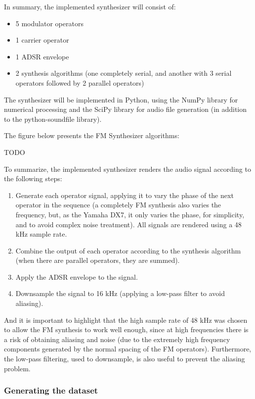 \documentclass[sigconf,natbib=false]{acmart}
\begin{document}
In summary, the implemented synthesizer will consist of:

\begin{itemize}
\item 5 modulator operators
\item 1 carrier operator
\item 1 ADSR envelope
\item 2 synthesis algorithms (one completely serial, and another with 3 serial operators followed by 2 parallel operators)
\end{itemize}

The synthesizer will be implemented in Python, using the NumPy library for numerical processing and the SciPy library for audio file generation (in addition to the python-soundfile library).

The figure below presents the FM Synthesizer algorithms:

TODO

To summarize, the implemented synthesizer renders the audio signal according to the following steps:

\begin{enumerate}
\item Generate each operator signal, applying it to vary the phase of the next operator in the sequence (a completely FM synthesis also varies the frequency, but, as the Yamaha DX7, it only varies the phase, for simplicity, and to avoid complex noise treatment). All signals are rendered using a 48 kHz sample rate.
\item Combine the output of each operator according to the synthesis algorithm (when there are parallel operators, they are summed).
\item Apply the ADSR envelope to the signal.
\item Downsample the signal to 16 kHz (applying a low-pass filter to avoid aliasing).
\end{enumerate}

And it is important to highlight that the high sample rate of 48 kHz was chosen to allow the FM synthesis to work well enough, since at high frequencies there is a risk of obtaining aliasing and noise (due to the extremely high frequency components generated by the normal spacing of the FM operators). Furthermore, the low-pass filtering, used to downsample, is also useful to prevent the aliasing problem.

\subsubsection{Generating the dataset}
\end{document}
